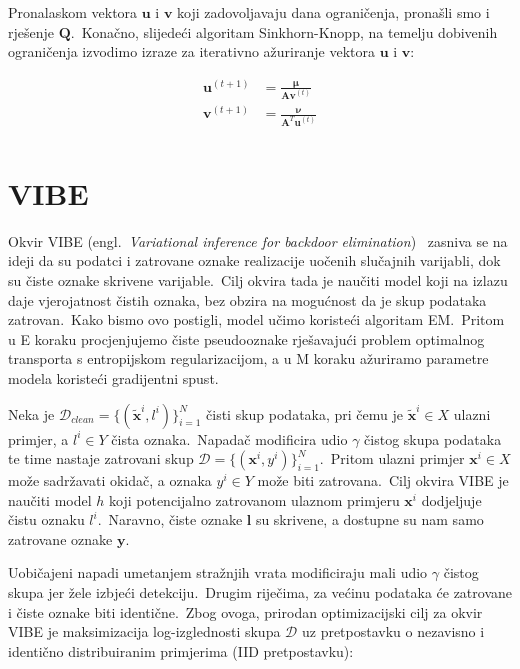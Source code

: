 \documentclass[diplomskirad]{fer}
\begin{document}
Pronalaskom vektora $\bm{u}$ i $\bm{v}$ koji zadovoljavaju dana ograničenja, pronašli smo i rješenje $\bm{Q}$.\ Konačno, slijedeći algoritam Sinkhorn-Knopp, na temelju dobivenih ograničenja izvodimo izraze za iterativno ažuriranje vektora $\bm{u}$ i $\bm{v}$:

\begin{equation}
  \begin{aligned}
    \bm{u}^{(t + 1)} &= \frac{\bm{\mu}}{\bm{A} \bm{v}^{(t)}} \\
    \bm{v}^{(t + 1)} &= \frac{\bm{\nu}}{\bm{A}^T \bm{u}^{(t)}} \\
  \end{aligned}
  \label{eq:sk_final}
\end{equation}

\chapter{VIBE}
\label{pog:vibe}

Okvir VIBE (engl.\ \textit{Variational inference for backdoor elimination})~\cite{sabolic2025seal} zasniva se na ideji da su podatci i zatrovane oznake realizacije uočenih slučajnih varijabli, dok su čiste oznake skrivene varijable.\ 
Cilj okvira tada je naučiti model koji na izlazu daje vjerojatnost čistih oznaka, bez obzira na mogućnost da je skup podataka zatrovan.\ Kako bismo ovo postigli, model učimo koristeći algoritam EM.\ 
Pritom u E koraku procjenjujemo čiste pseudooznake rješavajući problem optimalnog transporta s entropijskom regularizacijom, a u M koraku ažuriramo parametre modela koristeći gradijentni spust.\ 

Neka je $\mathcal{D}_{clean} = \{(\bm{\tilde{x}}^i, l^i)\}_{i=1}^{N}$ čisti skup podataka, pri čemu je $\bm{\tilde{x}}^i \in X$ ulazni primjer, a $l^i \in Y$ čista oznaka.\ 
Napadač modificira udio $\gamma$ čistog skupa podataka te time nastaje zatrovani skup $\mathcal{D} = \{(\bm{x}^i, y^i)\}_{i=1}^{N}$.\ Pritom ulazni primjer $\bm{x}^i \in X$ može sadržavati okidač, a oznaka $y^i \in Y$ može biti zatrovana.\ 
Cilj okvira VIBE je naučiti model $h$ koji potencijalno zatrovanom ulaznom primjeru $\bm{x}^i$ dodjeljuje čistu oznaku $l^i$.\ 
Naravno, čiste oznake $\bm{l}$ su skrivene, a dostupne su nam samo zatrovane oznake $\bm{y}$.\ 

Uobičajeni napadi umetanjem stražnjih vrata modificiraju mali udio $\gamma$ čistog skupa jer žele izbjeći detekciju.\ Drugim riječima, za većinu podataka će zatrovane i čiste oznake biti identične.\
Zbog ovoga, prirodan optimizacijski cilj za okvir VIBE je maksimizacija log-izglednosti skupa $\mathcal{D}$ uz pretpostavku o nezavisno i identično distribuiranim primjerima (IID pretpostavku):
\end{document}

